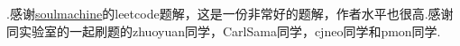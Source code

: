 

\begin{flushleft}
.感谢\href{https://github.com/soulmachine/leetcode}{soulmachine}的leetcode题解，这是一份非常好的题解，作者水平也很高.感谢同实验室的一起刷题的zhuoyuan同学，CarlSama同学，cjneo同学和pmon同学.
\end{flushleft}
